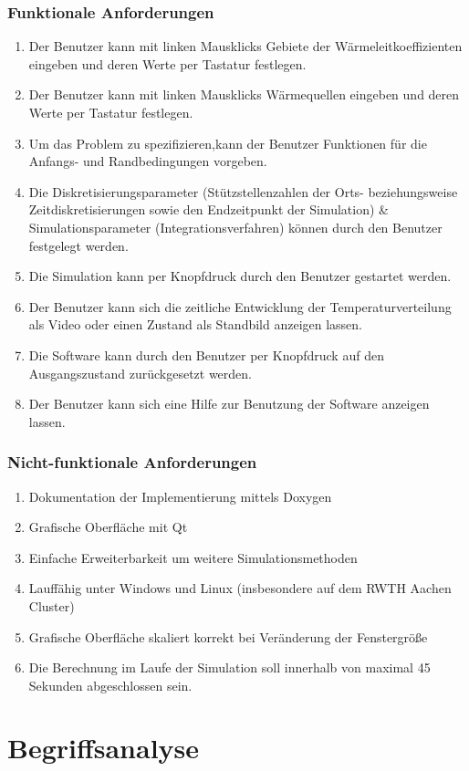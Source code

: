 \subsubsection*{Funktionale Anforderungen}

\begin{enumerate}
	\item Der Benutzer kann mit linken Mausklicks Gebiete der Wärmeleitkoeffizienten eingeben und deren Werte per Tastatur festlegen.
	\item Der Benutzer kann mit linken Mausklicks Wärmequellen eingeben und deren Werte per Tastatur festlegen.
	\item Um das Problem zu spezifizieren,kann der Benutzer Funktionen für die Anfangs- und Randbedingungen vorgeben.
	\item Die Diskretisierungsparameter (Stützstellenzahlen der Orts- beziehungsweise Zeitdiskretisierungen sowie den Endzeitpunkt der Simulation) \& Simulationsparameter (Integrationsverfahren) können durch den Benutzer festgelegt werden.
	\item Die Simulation kann per Knopfdruck durch den Benutzer gestartet werden.
	\item Der Benutzer kann sich die zeitliche Entwicklung der Temperaturverteilung als Video oder einen Zustand als Standbild anzeigen lassen.
	\item Die Software kann durch den Benutzer per Knopfdruck auf den Ausgangszustand zurückgesetzt werden.
	\item Der Benutzer kann sich eine Hilfe zur Benutzung der Software anzeigen lassen.
\end{enumerate}

\subsubsection*{Nicht-funktionale Anforderungen}

\begin{enumerate}
	\item Dokumentation der Implementierung mittels Doxygen
	\item Grafische Oberfläche mit Qt
	\item Einfache Erweiterbarkeit um weitere Simulationsmethoden
	\item Lauffähig unter Windows und Linux (insbesondere auf dem RWTH Aachen Cluster)
	\item Grafische Oberfläche skaliert korrekt bei Veränderung der Fenstergröße
	\item Die Berechnung im Laufe der Simulation soll innerhalb von maximal 45 Sekunden abgeschlossen sein.
\end{enumerate}


\section{Begriffsanalyse}

